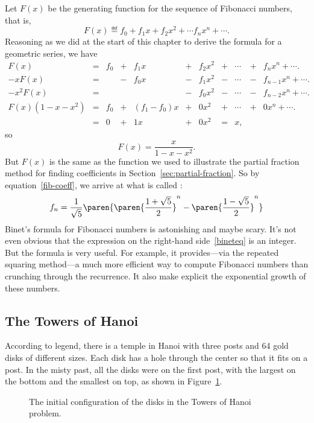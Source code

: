 Let $F(x)$ be the generating function for the sequence of
Fibonacci numbers, that is,
\[
F(x) \eqdef f_0 + f_1 x + f_2 x^2 + \cdots f_n x^n + \cdots.
\]
Reasoning as we did at the start of this chapter to derive the formula
for a geometric series, we have
\[
\begin{array}{rcrcrcrcrcrcr}
F(x)     & = & f_0 & + & f_1 x & + & f_2 x^2 & + & \cdots & + &    f_n x^n + \cdots.\\
-xF(x)   & = &     & - & f_0 x & - & f_1 x^2 & - & \cdots & - & f_{n-1} x^n + \cdots.\\
-x^2F(x) & = &     &   &       & - & f_0 x^2 & - & \cdots & - & f_{n-2} x^n + \cdots.\\
\hline
F(x)(1-x-x^2)
         & = & f_0 & + & (f_1-f_0) x
                               & + &   0 x^2 & + & \cdots & + & 0 x^n + \cdots.\\
         & = &  0  & + & 1   x & + &   0 x^2 & = & x,
\end{array}
\]
so
\[
F(x) = \frac{x}{1 - x - x^2}.
\]
But $F(x)$ is the same as the function we used to illustrate the
partial fraction method for finding coefficients in
Section~\ref{sec:partial-fraction}.  So by equation~\eqref{fib-coeff},
we arrive at what is called :
\begin{equation}\label{bineteq}
 f_n  = \frac{1}{\sqrt{5}}
      \paren{
      \paren{\frac{1 + \sqrt{5}}{2}}^n -
      \paren{\frac{1 - \sqrt{5}}{2}}^n}
\end{equation}
Binet's formula for Fibonacci numbers is astonishing and maybe scary.
It's not even obvious that the expression on the right-hand
side~\eqref{bineteq} is an integer.  But the formula is very useful.
For example, it provides---via the repeated squaring method---a much
more efficient way to compute Fibonacci numbers than crunching through
the recurrence.  It also make explicit the exponential growth of these
numbers.

\subsection{The Towers of Hanoi}\label{hanoi-subsec}
According to legend, there is a temple in Hanoi with three posts and
64 gold disks of different sizes.  Each disk has a hole through the
center so that it fits on a post.  In the misty past, all the disks
were on the first post, with the largest on the bottom and the
smallest on top, as shown in Figure~\ref{fig:10A1}.

\begin{figure}


\caption{The initial configuration of the disks in the Towers of Hanoi
  problem.}

\label{fig:10A1}

\end{figure}

